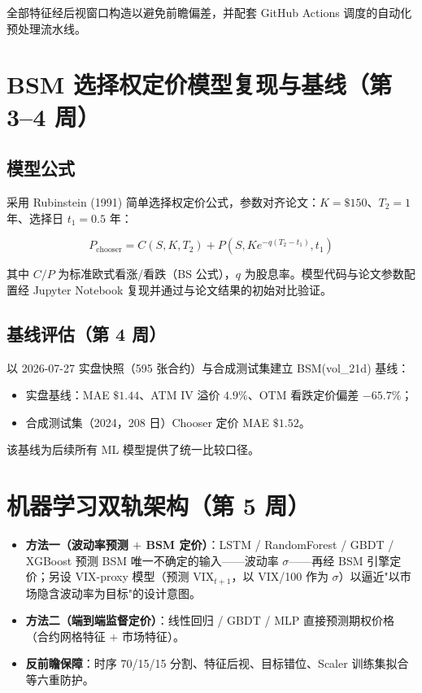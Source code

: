 \documentclass[11pt,a4paper]{article}
\begin{document}
全部特征经后视窗口构造以避免前瞻偏差，并配套 GitHub Actions 调度的自动化预处理流水线。

\section{BSM 选择权定价模型复现与基线（第 3--4 周）}

\subsection{模型公式}

采用 Rubinstein (1991) 简单选择权定价公式，参数对齐论文：$K=\$150$、$T_2=1$ 年、选择日 $t_1=0.5$ 年：

\begin{equation}
  P_{\mathrm{chooser}} = C(S,K,T_2) + P(S,Ke^{-q(T_2-t_1)},t_1)
\end{equation}

其中 $C/P$ 为标准欧式看涨/看跌（BS 公式），$q$ 为股息率。模型代码与论文参数配置经 Jupyter Notebook 复现并通过与论文结果的初始对比验证。

\subsection{基线评估（第 4 周）}

以 2026-07-27 实盘快照（595 张合约）与合成测试集建立 BSM(vol\_21d) 基线：
\begin{itemize}
  \item 实盘基线：MAE $\$1.44$、ATM IV 溢价 $4.9\%$、OTM 看跌定价偏差 $-65.7\%$；
  \item 合成测试集（2024，208 日）Chooser 定价 MAE $\$1.52$。
\end{itemize}

该基线为后续所有 ML 模型提供了统一比较口径。

\section{机器学习双轨架构（第 5 周）}

\begin{itemize}
  \item \textbf{方法一（波动率预测 $+$ BSM 定价）}：LSTM / RandomForest / GBDT / XGBoost 预测 BSM 唯一不确定的输入——波动率 $\sigma$——再经 BSM 引擎定价；另设 VIX-proxy 模型（预测 VIX$_{t+1}$，以 VIX/100 作为 $\sigma$）以逼近"以市场隐含波动率为目标"的设计意图。
  \item \textbf{方法二（端到端监督定价）}：线性回归 / GBDT / MLP 直接预测期权价格（合约网格特征 $+$ 市场特征）。
  \item \textbf{反前瞻保障}：时序 70/15/15 分割、特征后视、目标错位、Scaler 训练集拟合等六重防护。
\end{itemize}
\end{document}
